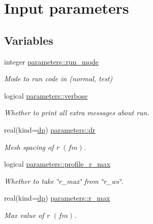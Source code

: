 \hypertarget{group__INPUT__PARS}{}\section{Input parameters}
\label{group__INPUT__PARS}
\subsection*{Variables}
\begin{DoxyCompactItemize}
\item 
integer \mbox{\hyperlink{group__INPUT__PARS_ga2b7774a07afe51f9f1e547e3104833e4}{parameters\+::run\+\_\+mode}}
\begin{DoxyCompactList}\small\item\em Mode to run code in (normal, test) \end{DoxyCompactList}\item 
logical \mbox{\hyperlink{group__INPUT__PARS_ga552f372a0ff4dff467424c48bedd6b49}{parameters\+::verbose}}
\begin{DoxyCompactList}\small\item\em Whether to print all extra messages about run. \end{DoxyCompactList}\item 
real(kind=\mbox{\hyperlink{namespaceparameters_a52f8c6351fd79345d8811e065bcbbb37}{dp}}) \mbox{\hyperlink{group__INPUT__PARS_gaa5f574e72af23ebd482368e0a7232ea1}{parameters\+::dr}}
\begin{DoxyCompactList}\small\item\em Mesh spacing of r $(fm)$. \end{DoxyCompactList}\item 
logical \mbox{\hyperlink{group__INPUT__PARS_ga4f6d2343db9c28bfad5b376839f279d7}{parameters\+::profile\+\_\+r\+\_\+max}}
\begin{DoxyCompactList}\small\item\em Whether to take \char`\"{}r\+\_\+max\char`\"{} from \char`\"{}r\+\_\+ws\char`\"{}. \end{DoxyCompactList}\item 
real(kind=\mbox{\hyperlink{namespaceparameters_a52f8c6351fd79345d8811e065bcbbb37}{dp}}) \mbox{\hyperlink{group__INPUT__PARS_ga9372571e59a93c139d629423a9104d69}{parameters\+::r\+\_\+max}}
\begin{DoxyCompactList}\small\item\em Max value of r $(fm)$. \end{DoxyCompactList}\item 

\end{DoxyCompactItemize}
